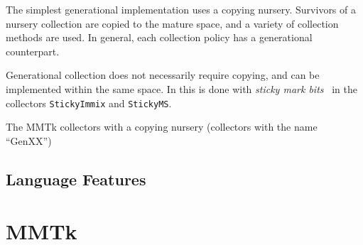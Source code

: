 The simplest generational implementation uses a copying nursery.  Survivors of 
a nursery collection are copied to the mature space, and a variety of collection
methods are used.  In general, each collection policy has a generational counterpart.

Generational collection does not necessarily require copying, and can be implemented
within the same space.  In \mmtk this is done with \emph{sticky mark bits}~\citep{Demers:1989}
in the collectors \lstinline|StickyImmix| and \lstinline|StickyMS|.

The MMTk collectors with a copying nursery (\ie collectors with the name ``GenXX'') 

\subsection{Language Features}
%
\section{MMTk}

%
% 

